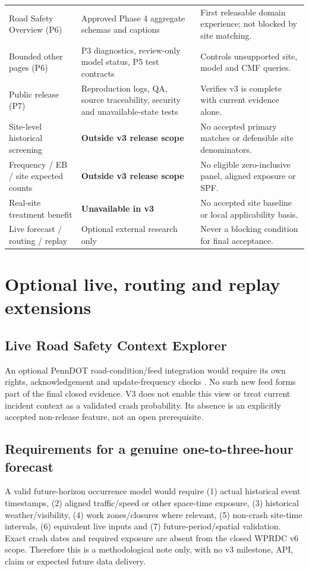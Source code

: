 \documentclass[11pt,a4paper,openany]{report}
\begin{document}
\begin{longtable}{@{}L{37mm}L{50mm}L{55mm}@{}}
Road Safety Overview (P6) & Approved Phase 4 aggregate schemas and captions & First releasable domain experience; not blocked by site matching.\\
Bounded other pages (P6) & P3 diagnostics, review-only model status, P5 test contracts & Controls unsupported site, model and CMF queries.\\
Public release (P7) & Reproduction logs, QA, source traceability, security and unavailable-state tests & Verifies v3 is complete with current evidence alone.\\
Site-level historical screening & \textbf{Outside v3 release scope} & No accepted primary matches or defensible site denominators.\\
Frequency / EB / site expected counts & \textbf{Outside v3 release scope} & No eligible zero-inclusive panel, aligned exposure or SPF.\\
Real-site treatment benefit & \textbf{Unavailable in v3} & No accepted site baseline or local applicability basis.\\
Live forecast / routing / replay & Optional external research only & Never a blocking condition for final acceptance.\\
\bottomrule\end{longtable}
\normalsize

\chapter{Optional live, routing and replay extensions}
\section{Live Road Safety Context Explorer}
An optional PennDOT road-condition/feed integration would require its own rights, acknowledgement and update-frequency checks \cite{RCRS}. No such new feed forms part of the final closed evidence. V3 does not enable this view or treat current incident context as a validated crash probability. Its absence is an explicitly accepted non-release feature, not an open prerequisite.

\section{Requirements for a genuine one-to-three-hour forecast}
A valid future-horizon occurrence model would require (1) actual historical event timestamps, (2) aligned traffic/speed or other space-time exposure, (3) historical weather/visibility, (4) work zones/closures where relevant, (5) non-crash site-time intervals, (6) equivalent live inputs and (7) future-period/spatial validation. Exact crash dates and required exposure are absent from the closed WPRDC v6 scope. Therefore this is a methodological note only, with no v3 milestone, API, claim or expected future data delivery.
\end{document}

